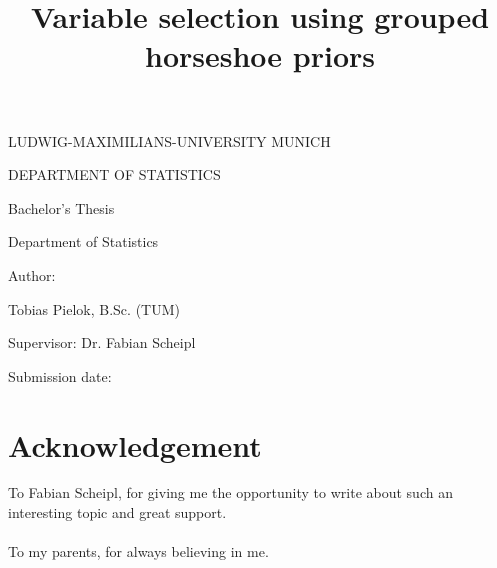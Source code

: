 \documentclass[12pt,letterpaper]{article}
\numberwithin{equation}{subsection}
\begin{document}
\begin{center}\uppercase{Ludwig-Maximilians-University Munich}\end{center}
\begin{center}\uppercase{Department of Statistics}\end{center}

\vspace{3cm}

\title{Variable selection using grouped horseshoe priors}
\date{\vspace{-5ex}}
{\let\newpage\relax\maketitle}
\thispagestyle{empty}


\begin{center}
  \begin{large}
    \begin{Large}
      Bachelor's Thesis\\
    \end{Large}
    Department of Statistics  \\
  \end{large}
\end{center}
\begin{center}
  Author:\\
  \begin{large}
    Tobias Pielok, B.Sc. (TUM)\\
  \end{large}
\end{center}
\vspace{1cm}
\begin{center}
  \begin{large}
    Supervisor: Dr. Fabian Scheipl
  \end{large}
\end{center}

\begin{center}  \begin{large}
    Submission date: \showdowfalse{} \\
  \end{large}
\end{center}

\vspace{1,5cm}

\newpage
\section*{Acknowledgement}
To Fabian Scheipl, for giving me the opportunity to write about such an interesting topic and great support. \\ \\
To my parents, for always believing in me.
\end{document}
